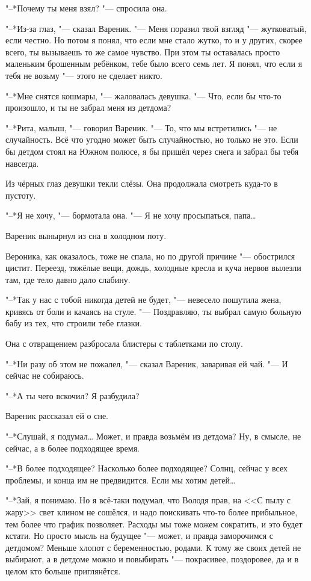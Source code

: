 "--*Почему ты меня взял? "--- спросила она.

"--*Из-за глаз, "--- сказал Вареник.
"--- Меня поразил твой взгляд "--- жутковатый, если честно.
Но потом я понял, что если мне стало жутко, то и у других, скорее всего, ты вызываешь то же самое чувство.
При этом ты оставалась просто маленьким брошенным ребёнком, тебе было всего семь лет.
Я понял, что если я тебя не возьму "--- этого не сделает никто.

"--*Мне снятся кошмары, "--- жаловалась девушка.
"--- Что, если бы что-то произошло, и ты не забрал меня из детдома?

"--*Рита, малыш, "--- говорил Вареник.
"--- То, что мы встретились "--- не случайность.
Всё что угодно может быть случайностью, но только не это.
Если бы детдом стоял на Южном полюсе, я бы пришёл через снега и забрал бы тебя навсегда.

Из чёрных глаз девушки текли слёзы.
Она продолжала смотреть куда-то в пустоту.

"--*Я не хочу, "--- бормотала она.
"--- Я не хочу просыпаться, папа\ldots{}

Вареник вынырнул из сна в холодном поту.

Вероника, как оказалось, тоже не спала, но по другой причине "--- обострился цистит.
Переезд, тяжёлые вещи, дождь, холодные кресла и куча нервов вылезли там, где тело давно дало слабину.

"--*Так у нас с тобой никогда детей не будет, "--- невесело пошутила жена, кривясь от боли и качаясь на стуле.
"--- Поздравляю, ты выбрал самую больную бабу из тех, что строили тебе глазки.

Она с отвращением разбросала блистеры с таблетками по столу.

"--*Ни разу об этом не пожалел, "--- сказал Вареник, заваривая ей чай.
"--- И сейчас не собираюсь.

"--*А ты чего вскочил?
Я разбудила?

Вареник рассказал ей о сне.

"--*Слушай, я подумал\ldots{}
Может, и правда возьмём из детдома?
Ну, в смысле, не сейчас, а в более подходящее время.

"--*В более подходящее?
Насколько более подходящее?
Солнц, сейчас у всех проблемы, и конца им не предвидится.
Если мы хотим детей\ldots{}

"--*Зай, я понимаю.
Но я всё-таки подумал, что Володя прав, на <<С пылу с жару>> свет клином не сошёлся, и надо поискивать что-то более прибыльное, тем более что график позволяет.
Расходы мы тоже можем сократить, и это будет кстати.
Но просто мысль на будущее "--- может, и правда заморочимся с детдомом?
Меньше хлопот с беременностью, родами.
К тому же своих детей не выбирают, а в детдоме можно и повыбирать "--- покрасивее, поздоровее, да и в целом кто больше приглянётся.

